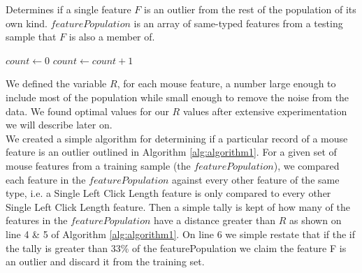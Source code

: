 \documentclass[conference]{IEEEtran}
\begin{document}
\begin{algorithm}

\caption{Determines if a single feature $F$ is an outlier from the rest of the population of its own kind. $featurePopulation$ is an array of same-typed features from a testing sample that $F$ is also a member of.}\label{euclid}
\begin{algorithmic}[1]
\State $\textit{count} \gets 0$
				\State $count \gets count + 1$
			\EndIf
	\EndFor

		\State {}
	\Else
		\State {} 

	\EndIf
\EndProcedure
\end{algorithmic}
\label{alg:algorithm1}

\end{algorithm}

We defined the variable $R$, for each mouse feature, a number large enough to include most of the population while small enough to remove the noise from the data. We found optimal values for our $R$ values after extensive experimentation we will describe later on.\\
We created a simple algorithm for determining if a particular record of a mouse feature is an outlier outlined in Algorithm \ref{alg:algorithm1}. For a given set of mouse features from a training sample (the $featurePopulation$), we compared each feature in the $featurePopulation$ against every other feature of the same type, i.e. a Single Left Click Length feature is only compared to every other Single Left Click Length feature. Then a simple tally is kept of how many of the features in the $featurePopulation$ have a distance greater than $R$ as shown on line 4 \& 5 of Algorithm \ref{alg:algorithm1}. On line 6 we simple restate that if the if the tally is greater than 33\% of the featurePopulation we claim the feature F is an outlier and discard it from the training set.
\end{document}
